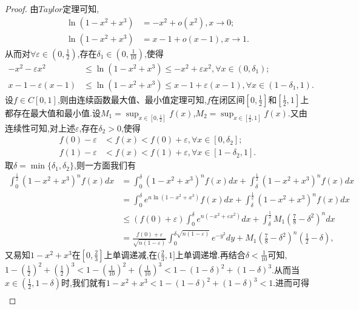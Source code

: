 \documentclass[lang=cn,newtx,10pt,scheme=chinese]{elegantbook}
\begin{document}
\begin{proof}
由\(Taylor\)定理可知,
\begin{align*}
\ln(1 - x^2 + x^3) &= -x^2 + o(x^2),  x\rightarrow 0;\\
\ln(1 - x^2 + x^3) &= x - 1 + o(x - 1),  x\rightarrow 1.
\end{align*}
从而对\(\forall \varepsilon \in (0,\frac{1}{2})\),存在\(\delta_1 \in (0,\frac{1}{10})\),使得
\begin{align*}
-x^2 - \varepsilon x^2&\leqslant\ln(1 - x^2 + x^3)\leqslant -x^2 + \varepsilon x^2, \forall x\in (0,\delta_1);\\
x - 1 - \varepsilon(x - 1)&\leqslant\ln(1 - x^2 + x^3)\leqslant x - 1 + \varepsilon(x - 1), \forall x\in (1 - \delta_1,1).
\end{align*}
设\(f\in C[0,1]\),则由连续函数最大值、最小值定理可知,\(f\)在闭区间\([0,\frac{1}{2}]\)和$[\frac{1}{2},1]$上都存在最大值和最小值.设\(M_1 = \sup_{x\in [0,\frac{1}{2}]}f(x)\),\(M_2 = \sup_{x\in [\frac{1}{2},1]}f(x)\).又由连续性可知,对上述\(\varepsilon\),存在\(\delta_2>0\),使得
\begin{align*}
f(0) - \varepsilon&< f(x) < f(0) + \varepsilon, \forall x\in [0,\delta_2];\\
f(1) - \varepsilon&< f(x) < f(1) + \varepsilon, \forall x\in [1 - \delta_2,1].
\end{align*}
取\(\delta = \min\{\delta_1,\delta_2\}\),则一方面我们有
\begin{align*}
\int_0^{\frac{1}{2}}{(1 - x^2 + x^3)^nf(x)dx}&=\int_0^{\delta}{(1 - x^2 + x^3)^nf(x)dx}+\int_{\delta}^{\frac{1}{2}}{(1 - x^2 + x^3)^nf(x)dx}\\
&=\int_0^{\delta}{e^{n\ln(1 - x^2 + x^3)}f(x)dx}+\int_{\delta}^{\frac{1}{2}}{(1 - x^2 + x^3)^nf(x)dx}\\
&\leqslant (f(0) + \varepsilon)\int_0^{\delta}{e^{n(-x^2 + \varepsilon x^2)}dx}+\int_{\delta}^{\frac{1}{2}}{M_1\left(\frac{7}{8}-\delta^2\right)^ndx}\\
&=\frac{f(0) + \varepsilon}{\sqrt{n(1 - \varepsilon)}}\int_0^{\delta\sqrt{n(1 - \varepsilon)}}{e^{-y^2}dy}+M_1\left(\frac{7}{8}-\delta^2\right)^n\left(\frac{1}{2}-\delta\right),
\end{align*}
又易知$1-x^2+x^3$在$[0,\frac{2}{3}]$上单调递减,在$(\frac{2}{3},1]$上单调递增.再结合$\delta<\frac{1}{10}$可知,$1-(\frac{1}{2})^2+(\frac{1}{2})^3<1-(\frac{1}{10})^2+(\frac{1}{10})^3<1-(1-\delta)^2+(1-\delta)^3$.从而当$x\in (\frac{1}{2},1-\delta)$时,我们就有$1-x^2+x^3<1-(1-\delta)^2+(1-\delta)^3<1$.进而可得
\begin{align*}

\end{align*}
\end{proof}
\end{document}
